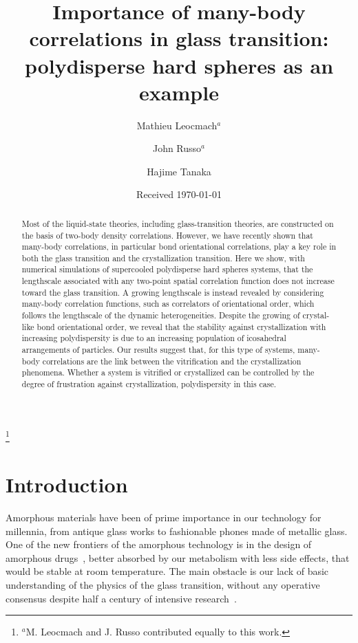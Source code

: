 \documentclass[twocolumn,superscriptaddress]{revtex4-1}
\begin{document}
\title{Importance of many-body correlations in glass transition: polydisperse hard spheres as an example} 

\author{Mathieu Leocmach$^a$}
\author{John Russo$^a$}
\author{Hajime Tanaka}
\thanks{$^a$M. Leocmach and J. Russo contributed equally to this work.}
\date{Received \today}

\begin{abstract}
Most of the liquid-state theories, including glass-transition theories, are constructed on the basis of two-body density correlations. 
However, we have recently shown that many-body correlations, in particular bond orientational correlations, play a key role in
both the glass transition and the crystallization transition.
Here we show, with numerical simulations of supercooled polydisperse hard spheres systems, that the lengthscale associated with any two-point spatial 
correlation function does not increase toward the glass transition. A growing lengthscale is instead revealed
by considering many-body correlation functions, such as correlators of orientational order,
which follows the lengthscale of the dynamic heterogeneities.
Despite the growing of crystal-like bond orientational order, we reveal that the stability against crystallization with increasing polydispersity
is due to an increasing population of icosahedral arrangements of particles. 
Our results suggest that, for this type of systems, many-body correlations are the link between the vitrification and the crystallization phenomena.
Whether a system is vitrified or crystallized can be controlled by the degree of frustration against crystallization, polydispersity 
in this case.  
\end{abstract}

\maketitle

\section{Introduction}

Amorphous materials have been of prime importance in our technology for millennia, from antique glass works to fashionable phones made of metallic glass. One of the new frontiers of the amorphous technology is in the design of amorphous drugs~\cite{Petit2006,Grzybowska2012}, better absorbed by our metabolism with less side effects, that would be stable at room temperature. The main obstacle is our lack of basic understanding of the physics of the glass transition, without any operative consensus despite half a century of intensive research~\citep{cavagna2009supercooled,BerthierR}.
\end{document}
